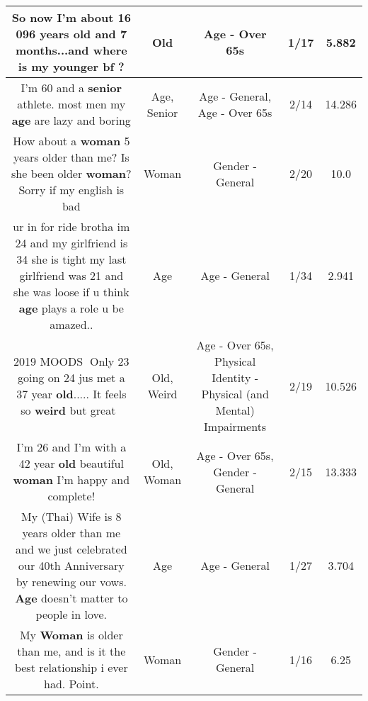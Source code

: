 \documentclass[11pt]{article}
\newlength\mylength
\begin{document}
\begin{center}
\begin{longtable}{|C{.65\mylength}|C{.30\mylength}|C{.12\mylength}|C{.12\mylength}|C{.12\mylength}|}
  \small So now I'm about 16 096 years \textbf{old} and 7 months...and where is my younger bf ?\normalsize   & Old & Age - Over 65s & 1/17 & 5.882 \\  \hline
  \small I'm 60 and a \textbf{senior} athlete. most men my \textbf{age} are lazy and boring\normalsize   & Age, Senior & Age - General, Age - Over 65s & 2/14 & 14.286 \\  \hline
  \small How about a \textbf{woman} 5 years older than me? Is she been older \textbf{woman}? Sorry if my english is bad\normalsize   & Woman & Gender - General & 2/20 & 10.0 \\  \hline
  \small ur in for ride brotha im 24 and my girlfriend is 34 she is tight my last girlfriend was 21 and she was loose if u think \textbf{age} plays a role u be amazed..\normalsize   & Age & Age - General & 1/34 & 2.941 \\  \hline
  \small 2019 MOODS🍌   Only 23 going on 24 jus met a 37 year \textbf{old}.....   It feels so \textbf{weird} but great🥥🥥\normalsize   & Old, Weird & Age - Over 65s, Physical Identity - Physical (and Mental) Impairments & 2/19 & 10.526 \\  \hline
  \small I'm 26 and I'm with a 42 year \textbf{old} beautiful \textbf{woman}    I'm happy and complete!\normalsize   & Old, Woman & Age - Over 65s, Gender - General & 2/15 & 13.333 \\  \hline
  \small My (Thai) Wife is 8 years older than me and we just celebrated our 40th Anniversary by renewing our vows. \textbf{Age} doesn't matter to people in love.\normalsize   & Age & Age - General & 1/27 & 3.704 \\  \hline
  \small My \textbf{Woman} is older than me, and is it the best relationship i ever had. Point.\normalsize   & Woman & Gender - General & 1/16 & 6.25 \\  \hline

\end{longtable}
\end{center}
\end{document}
